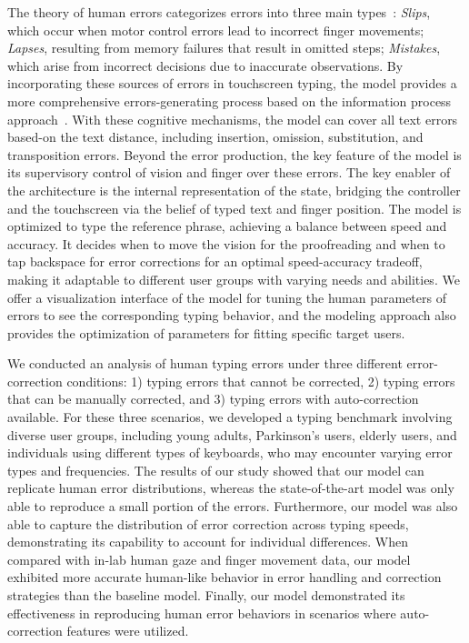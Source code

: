 The theory of human errors categorizes errors into three main types~\cite{reason1990human}: \textit{Slips}, which occur when motor control errors lead to incorrect finger movements; \textit{Lapses}, resulting from memory failures that result in omitted steps; \textit{Mistakes}, which arise from incorrect decisions due to inaccurate observations. 
By incorporating these sources of errors in touchscreen typing, the model provides a more comprehensive errors-generating process based on the information process approach~\cite{wickens2021engineering}.
With these cognitive mechanisms, the model can cover all text errors based-on the text distance, including insertion, omission, substitution, and transposition errors.
Beyond the error production, the key feature of the model is its supervisory control of vision and finger over these errors. The key enabler of the architecture is the internal representation of the state, bridging the controller and the touchscreen via the belief of typed text and finger position.
The model is optimized to type the reference phrase, achieving a balance between speed and accuracy. It decides when to move the vision for the proofreading and when to tap backspace for error corrections for an optimal speed-accuracy tradeoff, making it adaptable to different user groups with varying needs and abilities.
We offer a visualization interface of the model for tuning the human parameters of errors to see the corresponding typing behavior, and the modeling approach also provides the optimization of parameters for fitting specific target users.

We conducted an analysis of human typing errors under three different error-correction conditions: 1) typing errors that cannot be corrected, 2) typing errors that can be manually corrected, and 3) typing errors with auto-correction available.
For these three scenarios, we developed a typing benchmark involving diverse user groups, including young adults, Parkinson's users, elderly users, and individuals using different types of keyboards, who may encounter varying error types and frequencies. The results of our study showed that our model can replicate human error distributions, whereas the state-of-the-art model was only able to reproduce a small portion of the errors.
Furthermore, our model was also able to capture the distribution of error correction across typing speeds, demonstrating its capability to account for individual differences. When compared with in-lab human gaze and finger movement data, our model exhibited more accurate human-like behavior in error handling and correction strategies than the baseline model.
Finally, our model demonstrated its effectiveness in reproducing human error behaviors in scenarios where auto-correction features were utilized. 

